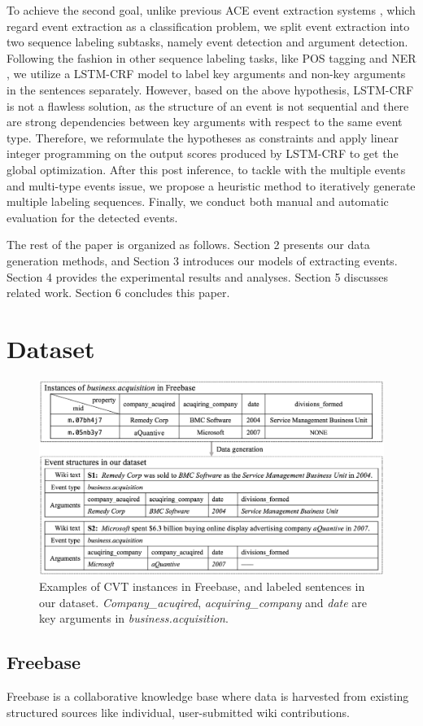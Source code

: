\documentclass{article}
\begin{document}
To achieve the second goal, unlike previous ACE event extraction systems \cite{li2013joint,chen2015event}, which regard event extraction as a classification problem, we split event extraction into two sequence labeling subtasks, namely event detection and argument detection. Following the fashion in other sequence labeling tasks, like POS tagging and NER \cite{huang2015bidirectional,lample2016neural}, we utilize a LSTM-CRF model to label key arguments and non-key arguments in the sentences separately. However, based on the above hypothesis, LSTM-CRF is not a flawless solution, as the structure of an event is not sequential and there are strong dependencies between key arguments with respect to the same event type. Therefore, we reformulate the hypotheses as constraints and apply linear integer programming on the output scores produced by LSTM-CRF to get the global optimization. After this post inference, to tackle with the multiple events and multi-type events issue, we propose a heuristic method to iteratively generate multiple labeling sequences. Finally, we conduct both manual and automatic evaluation for the detected events.

The rest of the paper is organized as follows. Section 2 presents our data generation methods, and Section 3 introduces our models of extracting events. Section 4 provides the experimental results and analyses. Section 5 discusses related work. Section 6 concludes this paper.

\section{Dataset}
\begin{figure}[h]
	\includegraphics[width=.5\textwidth]{temp}
	\caption{Examples of CVT instances in Freebase, and labeled sentences in our dataset. \emph{Company\_acuqired}, \emph{acquiring\_company} and \emph{date} are key arguments in \emph{business.acquisition}. \label{fig:3}}
\end{figure}

\subsection{Freebase}
Freebase\cite{bollacker2008freebase} is a collaborative knowledge base where data is harvested from existing structured sources like individual, user-submitted wiki contributions.
\end{document}
